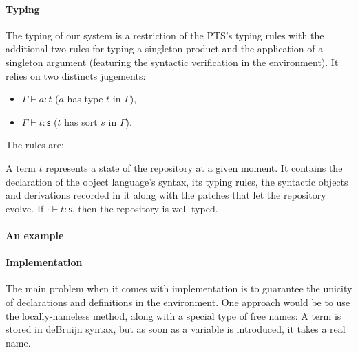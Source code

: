 \documentclass[12pt]{article}
\newcommand{\sort}{\textsf{s}}
\newcommand{\subst}[2]{\{#1/#2\}}
\begin{document}
\paragraph{Typing} The typing of our system is a restriction of the
PTS's typing rules with the additional two rules for typing a singleton
product and the application of a singleton argument (featuring the
syntactic verification in the environment). It relies on two distincts
jugements:
\begin{itemize}
\item $\Gamma\vdash a : t$ ($a$ has type $t$ in $\Gamma$),
\item $\Gamma\vdash t : \sort$ ($t$ has sort $s$ in $\Gamma$).
\end{itemize}
The rules are:

A term $t$ represents a state of the repository at a given moment. It
contains the declaration of the object language's syntax, its typing
rules, the syntactic objects and derivations recorded in it along with
the patches that let the repository evolve. If $\cdot\vdash t:\sort$,
then the repository is well-typed.

\paragraph{An example}

\paragraph{Implementation}

The main problem when it comes with implementation is to guarantee the
unicity of declarations and definitions in the environment. One
approach would be to use the locally-nameless method, along with a
special type of free names: A term is stored in deBruijn syntax, but
as soon as a variable is introduced, it takes a real name. 
\end{document}
